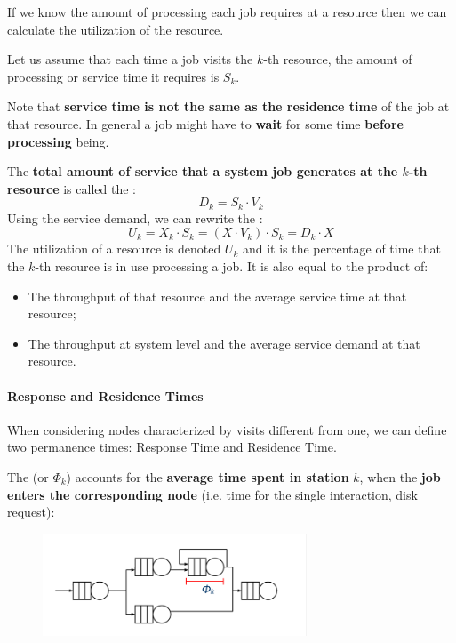 If we know the amount of processing each job requires at a resource then we can calculate the utilization of the resource.

\highspace
Let us assume that each time a job visits the $k$-th resource, the amount of processing or service time it requires is $S_{k}$.

\highspace
Note that \textbf{service time is not the same as the residence time} of the job at that resource. In general a job might have to \textbf{wait} for some time \textbf{before processing} being.

\highspace
The \textbf{total amount of service that a system job generates at the $k$-th resource} is called the :
\begin{equation}
	D_{k} = S_{k} \cdot V_{k}
\end{equation}
Using the service demand, we can rewrite the :
\begin{equation}
	U_{k} = X_{k} \cdot S_{k} = \left(X \cdot V_{k}\right) \cdot S_{k} = D_{k} \cdot X
\end{equation}
The utilization of a resource is denoted $U_{k}$ and it is the percentage of time that the $k$-th resource is in use processing a job. It is also equal to the product of:
\begin{itemize}
	\item The throughput of that resource and the average service time at that resource;
	
	\item The throughput at system level and the average service demand at that resource.
\end{itemize}

\newpage

\paragraph{Response and Residence Times}

When considering nodes characterized by visits different from one, we can define two permanence times: Response Time and Residence Time.

\highspace
The  (or $\Phi_{k}$) accounts for the \textbf{average time spent in station} $k$, when the \textbf{job enters the corresponding node} (i.e. time for the single interaction, disk request):
\begin{figure}[!htp]
	\centering
	\includegraphics[width=0.7\textwidth]{img/response-time.png}
\end{figure}

